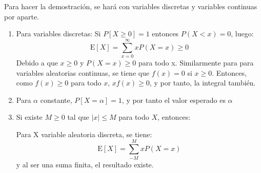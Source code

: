 \begin{Demo} Para hacer la demostración, se hará con variables discretas 
    y variables continuas por aparte.

    \begin{enumerate}
        \item Para variables discretas:
        Si $P[X \geq 0]=1$ entonces $P(X < x)=0$, luego:
        \[
            \text{E}[X]=\sum_{x=0}^{\infty}xP(X=x) \geq  0
        \]
        Debido a que $x\geq0$ y $P(X=x)\geq 0$ para todo x.
        Similarmente para para variables aleatorias continuas, se tiene
        que $f(x)=0$ si $x\geq0$. Entonces, como $f(x)\geq0$ para todo $x$,
        $xf(x)\geq0$, y por tanto, la integral también.
        \item Para $\alpha$ constante, $P[X=\alpha]=1$, y por tanto el valor
        esperado es $\alpha$
        \item Si existe $M\geq0$ tal que $|x|\leq M$ para todo $X$, entonces:
        
        Para X variable aleatoria discreta, se tiene:
        \[
            \text{E}[X]=\sum_{-M}^{M}xP(X=x)
        \]
        y al ser una suma finita, el resultado existe. 
        

\end{enumerate}
\end{Demo}
